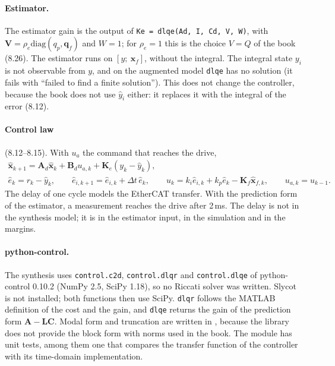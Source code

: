 \documentclass[10pt,a4paper]{article}
\numberwithin{equation}{section}
\begin{document}
\paragraph{Estimator.} The estimator gain is the output of \texttt{Ke = dlqe(Ad, I, Cd, V, W)}, with $\mathbf V=\rho_e\mathrm{diag}(q_p,\mathbf q_f)$ and $W=1$; for $\rho_e=1$ this is the choice $V=Q$ of the book (8.26). The estimator runs on $[y;\ \mathbf x_f]$, without the integral. The integral state $y_i$ is not observable from $y$, and on the augmented model \texttt{dlqe} has no solution (it fails with ``failed to find a finite solution''). This does not change the controller, because the book does not use $\hat y_i$ either: it replaces it with the integral of the error (8.12).

\paragraph{Control law} (8.12--8.15). With $u_a$ the command that reaches the drive,
\begin{gather}
\hat{\mathbf x}_{k+1}=\mathbf A_d\hat{\mathbf x}_k+\mathbf B_du_{a,k}+\mathbf K_e(y_k-\hat y_k),\\
\hat e_k=r_k-\hat y_k,\qquad \hat e_{i,k+1}=\hat e_{i,k}+\Delta t\,\hat e_k,\qquad u_k=k_i\hat e_{i,k}+k_p\hat e_k-\mathbf K_f\hat{\mathbf x}_{f,k},\qquad u_{a,k}=u_{k-1}.
\end{gather}
The delay of one cycle models the EtherCAT transfer. With the prediction form of the estimator, a measurement reaches the drive after 2\,ms. The delay is not in the synthesis model; it is in the estimator input, in the simulation and in the margins.

\paragraph{python-control.} The synthesis uses \texttt{control.c2d}, \texttt{control.dlqr} and \texttt{control.dlqe} of python-control 0.10.2 (NumPy 2.5, SciPy 1.18), so no Riccati solver was written. Slycot is not installed; both functions then use SciPy. \texttt{dlqr} follows the MATLAB definition of the cost and the gain, and \texttt{dlqe} returns the gain of the prediction form $\mathbf A-\mathbf L\mathbf C$. Modal form and truncation are written in , because the library does not provide the block form with norms used in the book. The module has unit tests, among them one that compares the transfer function of the controller with its time-domain implementation.
\end{document}
